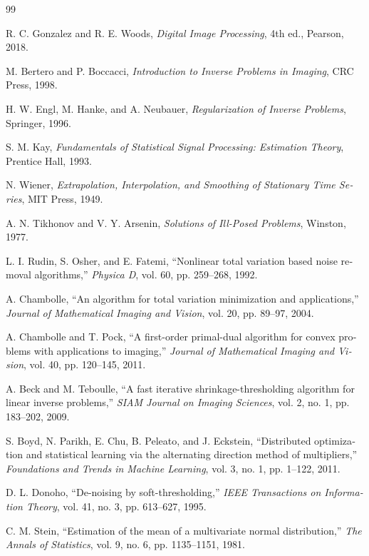 \documentclass[12pt,openany,oneside]{book}
\begin{document}
\begin{latin}
\begin{thebibliography}{99}

R. C. Gonzalez and R. E. Woods,
\textit{Digital Image Processing}, 4th ed., Pearson, 2018.

M. Bertero and P. Boccacci,
\textit{Introduction to Inverse Problems in Imaging}, CRC Press, 1998.

H. W. Engl, M. Hanke, and A. Neubauer,
\textit{Regularization of Inverse Problems}, Springer, 1996.

S. M. Kay,
\textit{Fundamentals of Statistical Signal Processing: Estimation Theory}, Prentice Hall, 1993.

N. Wiener,
\textit{Extrapolation, Interpolation, and Smoothing of Stationary Time Series}, MIT Press, 1949.

A. N. Tikhonov and V. Y. Arsenin,
\textit{Solutions of Ill-Posed Problems}, Winston, 1977.

L. I. Rudin, S. Osher, and E. Fatemi,
``Nonlinear total variation based noise removal algorithms,''
\textit{Physica D}, vol. 60, pp. 259--268, 1992.

A. Chambolle,
``An algorithm for total variation minimization and applications,''
\textit{Journal of Mathematical Imaging and Vision}, vol. 20, pp. 89--97, 2004.

A. Chambolle and T. Pock,
``A first-order primal-dual algorithm for convex problems with applications to imaging,''
\textit{Journal of Mathematical Imaging and Vision}, vol. 40, pp. 120--145, 2011.

A. Beck and M. Teboulle,
``A fast iterative shrinkage-thresholding algorithm for linear inverse problems,''
\textit{SIAM Journal on Imaging Sciences}, vol. 2, no. 1, pp. 183--202, 2009.

S. Boyd, N. Parikh, E. Chu, B. Peleato, and J. Eckstein,
``Distributed optimization and statistical learning via the alternating direction method of multipliers,''
\textit{Foundations and Trends in Machine Learning}, vol. 3, no. 1, pp. 1--122, 2011.

D. L. Donoho,
``De-noising by soft-thresholding,''
\textit{IEEE Transactions on Information Theory}, vol. 41, no. 3, pp. 613--627, 1995.

C. M. Stein,
``Estimation of the mean of a multivariate normal distribution,''
\textit{The Annals of Statistics}, vol. 9, no. 6, pp. 1135--1151, 1981.


\end{thebibliography}
\end{latin}
\end{document}

